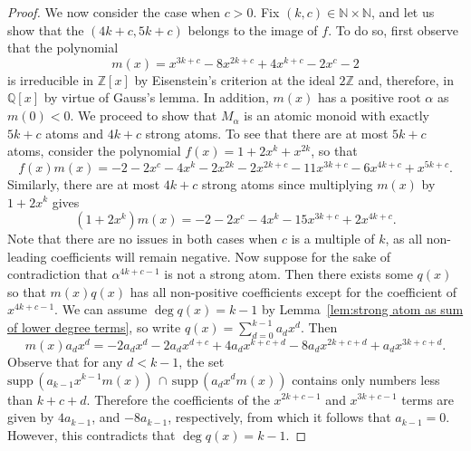 \documentclass[11pt]{amsart}
\theoremstyle{definition}
\theoremstyle{remark}
\numberwithin{equation}{section}
\newcommand{\nn}{\mathbb{N}}
\newcommand{\N}{\mathbb{N}}
\newcommand{\qq}{\mathbb{Q}}
\newcommand{\zz}{\mathbb{Z}}
\newcommand{\supp}{\text{supp}\,}
\begin{document}
\begin{proof}
    We now consider the case when $c>0$. Fix $(k,c) \in \nn \times \N$, and let us show that the $(4k+c,5k+c)$ belongs to the image of $f$. To do so, first observe that the polynomial
    \[
    	m(x) = x^{3k+c} - 8x^{2k+c} + 4x^{k+c} - 2x^c - 2
    \]
    is irreducible in $\zz[x]$ by Eisenstein's criterion at the ideal $2\zz$ and, therefore, in $\qq[x]$ by virtue of Gauss's lemma. In addition, $m(x)$ has a positive root $\alpha$ as $m(0) < 0$. We proceed to show that $M_\alpha$ is an atomic monoid with exactly $5k+c$ atoms and $4k+c$ strong atoms. To see that there are at most $5k+c$ atoms, consider the polynomial $f(x) = 1 + 2x^k + x^{2k}$, so that
    \[
        f(x)m(x)=-2-2x^c-4x^k-2x^{2k}-2x^{2k+c}-11x^{3k+c}-6x^{4k+c}+x^{5k+c}.
    \]
    Similarly, there are at most $4k+c$ strong atoms since multiplying $m(x)$ by $1+2x^k$ gives
    \[
    	(1+2x^{k}) m(x) = -2-2x^c-4x^k-15x^{3k+c}+2x^{4k+c}.
    \]
    Note that there are no issues in both cases when $c$ is a multiple of $k$, as all non-leading coefficients will remain negative. Now suppose for the sake of contradiction that $\alpha^{4k+c-1}$ is not a strong atom. Then there exists some $q(x)$ so that $m(x)q(x)$ has all non-positive coefficients except for the coefficient of $x^{4k+c-1}$. We can assume $\deg q(x)=k-1$ by Lemma~\ref{lem:strong atom as sum of lower degree terms}, so write $q(x)=\sum_{d=0}^{k-1}a_dx^d$. Then
    \[
    	 m(x) a_dx^d = -2a_dx^d-2a_dx^{d+c}+4a_dx^{k+c+d}-8a_dx^{2k+c+d}+a_dx^{3k+c+d}.
    \]
    Observe that for any $d<k-1$, the set $\supp(a_{k-1}x^{k-1}m(x))\,\cap\,\supp(a_{d}x^{d}m(x))$ contains only numbers less than $k+c+d$. Therefore the coefficients of the $x^{2k+c-1}$ and $x^{3k+c-1}$ terms are given by $4a_{k-1}$, and $-8a_{k-1}$, respectively, from which it follows that $a_{k-1} = 0$. However, this contradicts that $\deg q(x) = k-1$.
    

\end{proof}
\end{document}
